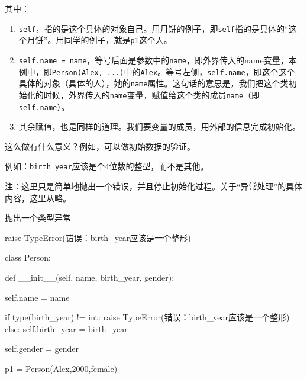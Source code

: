 \documentclass[
  letterpaper,
  DIV=11,
  numbers=noendperiod]{scrreprt}
\newenvironment{Shaded}{\begin{snugshade}}{\end{snugshade}}
\newcommand{\BuiltInTok}[1]{\textcolor[rgb]{0.00,0.23,0.31}{#1}}
\newcommand{\ControlFlowTok}[1]{\textcolor[rgb]{0.00,0.23,0.31}{#1}}
\newcommand{\FunctionTok}[1]{\textcolor[rgb]{0.28,0.35,0.67}{#1}}
\newcommand{\KeywordTok}[1]{\textcolor[rgb]{0.00,0.23,0.31}{#1}}
\newcommand{\NormalTok}[1]{\textcolor[rgb]{0.00,0.23,0.31}{#1}}
\newcommand{\OperatorTok}[1]{\textcolor[rgb]{0.37,0.37,0.37}{#1}}
\newcommand{\PreprocessorTok}[1]{\textcolor[rgb]{0.68,0.00,0.00}{#1}}
\newcommand{\StringTok}[1]{\textcolor[rgb]{0.13,0.47,0.30}{#1}}
\newcommand{\VariableTok}[1]{\textcolor[rgb]{0.07,0.07,0.07}{#1}}
\providecommand{\tightlist}{%
  \setlength{\itemsep}{0pt}\setlength{\parskip}{0pt}}\usepackage{longtable,booktabs,array}
\begin{document}
其中：

\begin{enumerate}
\def\labelenumi{\arabic{enumi}.}
\tightlist
\item
  \texttt{self}，指的是这个具体的对象自己。用月饼的例子，即\texttt{self}指的是具体的``这个月饼''。用同学的例子，就是\texttt{p1}这个人。
\item
  \texttt{self.name\ =\ name}，等号后面是参数中的\texttt{name}，即外界传入的name变量，本例中，即\texttt{Person(\textquotesingle{}Alex\textquotesingle{},\ ...)}中的\texttt{\textquotesingle{}Alex\textquotesingle{}}。等号左侧，\texttt{self.name}，即这个这个具体的对象（具体的人），她的\texttt{name}属性。这句话的意思是，我们把这个类初始化的时候，外界传入的\texttt{name}变量，赋值给这个类的成员\texttt{name}（即\texttt{self.name}）。
\item
  其余赋值，也是同样的道理。我们要变量的成员，用外部的信息完成初始化。
\end{enumerate}

这么做有什么意义？例如，可以做初始数据的验证。

例如：\texttt{birth\_year}应该是个4位数的整型，而不是其他。

注：这里只是简单地抛出一个错误，并且停止初始化过程。关于``异常处理''的具体内容，这里从略。

抛出一个类型异常

\begin{Shaded}
\begin{Highlighting}[]
\ControlFlowTok{raise} \PreprocessorTok{TypeError}\NormalTok{(}\StringTok{\textquotesingle{}错误：birth\_year应该是一个整形\textquotesingle{}}\NormalTok{)}
\end{Highlighting}
\end{Shaded}

\begin{Shaded}
\begin{Highlighting}[]
\KeywordTok{class}\NormalTok{ Person:}

    \KeywordTok{def} \FunctionTok{\_\_init\_\_}\NormalTok{(}\VariableTok{self}\NormalTok{, name, birth\_year, gender):}

        \VariableTok{self}\NormalTok{.name }\OperatorTok{=}\NormalTok{ name}
        
        \ControlFlowTok{if} \BuiltInTok{type}\NormalTok{(birth\_year) }\OperatorTok{!=} \BuiltInTok{int}\NormalTok{:}
            \ControlFlowTok{raise} \PreprocessorTok{TypeError}\NormalTok{(}\StringTok{\textquotesingle{}错误：birth\_year应该是一个整形\textquotesingle{}}\NormalTok{)}
        \ControlFlowTok{else}\NormalTok{:}
            \VariableTok{self}\NormalTok{.birth\_year }\OperatorTok{=}\NormalTok{ birth\_year}

        \VariableTok{self}\NormalTok{.gender }\OperatorTok{=}\NormalTok{ gender}
    
\NormalTok{p1 }\OperatorTok{=}\NormalTok{ Person(}\StringTok{\textquotesingle{}Alex\textquotesingle{}}\NormalTok{,}\StringTok{\textquotesingle{}2000\textquotesingle{}}\NormalTok{,}\StringTok{\textquotesingle{}female\textquotesingle{}}\NormalTok{)}
\end{Highlighting}
\end{Shaded}
\end{document}
